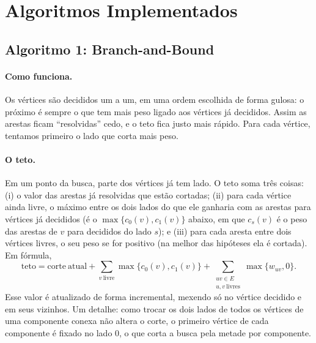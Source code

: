\section{Algoritmos Implementados}

\subsection{Algoritmo 1: Branch-and-Bound}

\paragraph{Como funciona.} Os vértices são decididos um a um, em uma ordem escolhida de forma gulosa: o próximo é sempre o que tem mais peso ligado aos vértices já decididos. Assim as arestas ficam ``resolvidas'' cedo, e o teto fica justo mais rápido. Para cada vértice, tentamos primeiro o lado que corta mais peso.

\paragraph{O teto.} Em um ponto da busca, parte dos vértices já tem lado. O teto soma três coisas: (i) o valor das arestas já resolvidas que estão cortadas; (ii) para cada vértice ainda livre, o máximo entre os dois lados do que ele ganharia com as arestas para vértices já decididos (é o $\max\{c_0(v),c_1(v)\}$ abaixo, em que $c_s(v)$ é o peso das arestas de $v$ para decididos do lado $s$); e (iii) para cada aresta entre dois vértices livres, o seu peso se for positivo (na melhor das hipóteses ela é cortada). Em fórmula,
\begin{equation}\label{eq:ub}
  \mathrm{teto}=\mathrm{corte\ atual}+\sum_{v\ \text{livre}}\max\{c_0(v),c_1(v)\}+\sum_{\substack{uv\in E\\ u,v\ \text{livres}}}\max\{w_{uv},0\}.
\end{equation}
Esse valor é atualizado de forma incremental, mexendo só no vértice decidido e em seus vizinhos. Um detalhe: como trocar os dois lados de todos os vértices de uma componente conexa não altera o corte, o primeiro vértice de cada componente é fixado no lado 0, o que corta a busca pela metade por componente.

